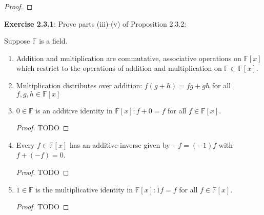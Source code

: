 \documentclass[a4paper]{article}
\begin{document}
\begin{myparindent}{0pt}
\begin{proof}
\end{proof}

\textbf{Exercise 2.3.1}:
Prove parts (iii)-(v) of Proposition 2.3.2:

Suppose $\mathbb{F}$ is a field.

\begin{enumerate}[label=(\roman*)]
  \item Addition and multiplication are commutative, associative operations on
  $\mathbb{F}[x]$ which restrict to the operations of addition and multiplication
  on $\mathbb{F} \subset \mathbb{F}[x]$.

  \item Multiplication distributes over addition: $f(g + h) = fg + gh$ for all
  $f, g, h \in \mathbb{F}[x]$

  \item $0 \in \mathbb{F}$ is an additive identity in $\mathbb{F}[x]: f + 0 = f$
  for all $f \in \mathbb{F}[x]$.
    \begin{proof}
    TODO
    \end{proof}

  \item Every $f \in \mathbb{F}[x]$ has an additive inverse given by
  $-f = (-1)f$ with $f + (-f) = 0$.
    \begin{proof}
    TODO
    \end{proof}

  \item $1 \in \mathbb{F}$ is the multiplicative identity in
  $\mathbb{F}[x]: 1f = f$ for all $f \in \mathbb{F}[x]$.
    \begin{proof}
    TODO
    \end{proof}
\end{enumerate}

\end{myparindent}
\end{document}
